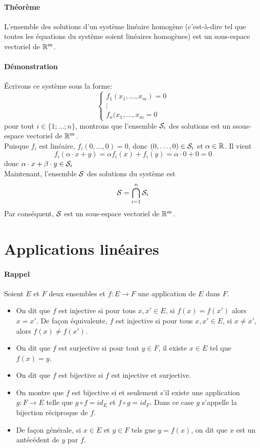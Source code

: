 \paragraph{Théorème} L'ensemble des solutions d'un système linéaire homogène (c'est-à-dire tel que toutes les équations du système soient linéaires homogènes) est un sous-espace vectoriel de $\mathbb{R}^m$.
\paragraph{Démonstration} Écrivons ce système sous la forme:
$$ \left\{ \begin{matrix}
  f_1(x_1, \ldots, x_m) = 0\\
  \vdots \\
  f_n(x_1, \ldots, x_m = 0
\end{matrix} \right. $$
pour tout $i \in \{1; \ldots; n\}$, montrons que l'ensemble $\mathcal{S}_i$ des solutions est un ssous-espace vectoriel de $\mathbb{R}^m$. \\
Puisque $f_i$ est linéaire, $f_i(0, \ldots, 0) = 0$, donc $(0,  \ldots, 0) \in \mathcal{S}_i$ et $\alpha \in \mathbb{R}$. Il vient 
$$f_i(\alpha \cdot x + y) = \alpha f_i(x) + f_i(y) = \alpha \cdot 0 
+ 0 = 0$$
donc $\alpha \cdot x + \beta \cdot y \in \mathcal{S}_i$ \\
Maintenant, l'ensemble $\mathcal{S}$ des solutions du système est 
$$\mathcal{S} =  \bigcap_{i=1}^n {\mathcal{S}_i}$$
Par conséquent, $\mathcal{S}$ est un sous-espace vectoriel de $\mathbb{R}^m$.

%
%
\section{Applications linéaires}
%
%
\paragraph{Rappel} Soient $E$ et $F$ deux ensembles et $f: E \rightarrow F$ une application de $E$ dans $F$.
\begin{itemize}
 \item On dit que $f$ est injective si pour tous $x, x' \in E$, si $f(x) = f(x')$ alors $x=x'$. De façon équivalente, $f$ est injective si pour tous $x, x' \in E$, si $x \neq x'$, alors $f(x) \neq f(x')$.
  \item On dit que $f$ est surjective si pour tout $y \in F$, il existe $x \in E$ tel que $f(x) = y$. 
  \item On dit que $f$ est bijective si $f$ est injective et surjective.
  \item On montre que $f$ est bijective si et seulement s'il existe une application $g: F \rightarrow E$ telle que $g \circ f = id_E$ et $f \circ g = id_F$. Dans ce case $g$ s'appelle la bijection réciproque de $f$.
  \item De façon générale, si $x \in E$ et $y \in F$ tels gue $y = f(x)$, on dit que $x$ est un antécédent de $y$ par $f$.
\end{itemize}

